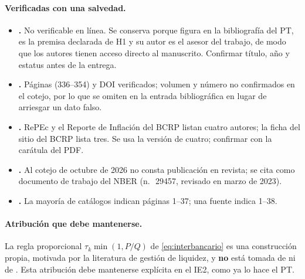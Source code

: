 \documentclass[11pt]{article}
\theoremstyle{definition}
\begin{document}
\paragraph{Verificadas con una salvedad.}
\begin{itemize}[leftmargin=*,itemsep=2pt]
\item \textbf{\citet{ortiz2026}.} No verificable en l\'inea. Se conserva porque
figura en la bibliograf\'ia del PT, es la premisa declarada de H1 y su autor es el
asesor del trabajo, de modo que los autores tienen acceso directo al manuscrito.
Confirmar t\'itulo, a\~no y estatus antes de la entrega.
\item \textbf{\citet{heider2015}.} P\'aginas (336--354) y DOI verificados; volumen
y n\'umero no confirmados en el cotejo, por lo que se omiten en la entrada
bibliogr\'afica en lugar de arriesgar un dato falso.
\item \textbf{\citet{castillo2016}.} RePEc y el Reporte de Inflaci\'on del BCRP
listan cuatro autores; la ficha del sitio del BCRP lista tres. Se usa la versi\'on
de cuatro; confirmar con la car\'atula del PDF.
\item \textbf{\citet{bianchibigioengel2021}.} Al cotejo de octubre de 2026 no
consta publicaci\'on en revista; se cita como documento de trabajo del NBER
(n.\,\textordmasculine\ 29457, revisado en marzo de 2023).
\item \textbf{\citet{baltensperger1980}.} La mayor\'ia de cat\'alogos indican
p\'aginas 1--37; una fuente indica 1--38.
\end{itemize}

\paragraph{Atribuci\'on que debe mantenerse.} La regla proporcional
$\tau_k\min(1,P/Q)$ de \eqref{eq:interbancario} es una construcci\'on propia,
motivada por la literatura de gesti\'on de liquidez, y \textbf{no} est\'a tomada de
\citet{bianchibigio2022} ni de \citet{afonso2015}. Esta atribuci\'on debe
mantenerse expl\'icita en el IE2, como ya lo hace el PT.


\end{document}

